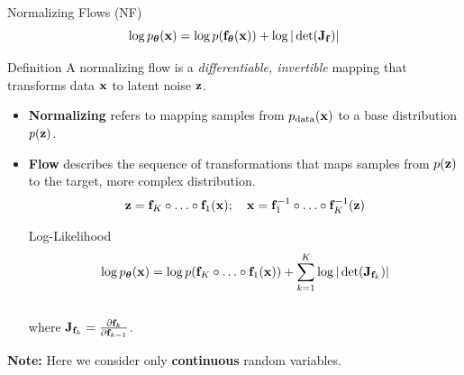 \documentclass{beamer}
\begin{document}
\begin{frame}{Normalizing Flows (NF)}
	\vspace{-0.3cm}
	\[
		\log p_{\boldsymbol{\theta}}(\mathbf{x}) = \log p(\mathbf{f}_{\boldsymbol{\theta}}(\mathbf{x})) + \log |\det (\mathbf{J}_{\mathbf{f}})|
	\]
	\vspace{-0.4cm}
	\begin{block}{Definition}
		A normalizing flow is a \textit{differentiable, invertible} mapping that transforms data $\mathbf{x}$ to latent noise $\mathbf{z}$.
	\end{block}
    \eqpause
	\begin{itemize}
		\item \textbf{Normalizing} refers to mapping samples from $p_{\text{data}}(\mathbf{x})$ to a base distribution $p(\mathbf{z})$.
		\item \textbf{Flow} describes the sequence of transformations that maps samples from $p(\mathbf{z})$ to the target, more complex distribution.
		\[
			\mathbf{z} = \mathbf{f}_K \circ \ldots \circ \mathbf{f}_1(\mathbf{x}); \quad \mathbf{x} = \mathbf{f}_1^{-1} \circ \ldots \circ \mathbf{f}_K^{-1} (\mathbf{z})
		\] 
		\vspace{-0.4cm}
		\eqpause
		\begin{block}{Log-Likelihood}
			\vspace{-0.5cm}
			\[
				\log p_{\boldsymbol{\theta}}(\mathbf{x}) = \log p(\mathbf{f}_K \circ \ldots \circ \mathbf{f}_1(\mathbf{x})) + \sum_{k=1}^K \log |\det (\mathbf{J}_{\mathbf{f}_k})|
			\]
			\vspace{-0.4cm} \\
			where $\mathbf{J}_{\mathbf{f}_k} = \frac{\partial \mathbf{f}_k}{\partial \mathbf{f}_{k-1}}$.
		\end{block}
	\end{itemize}
	\eqpause
	\textbf{Note:} Here we consider only \textbf{continuous} random variables.
\end{frame}
\end{document}

